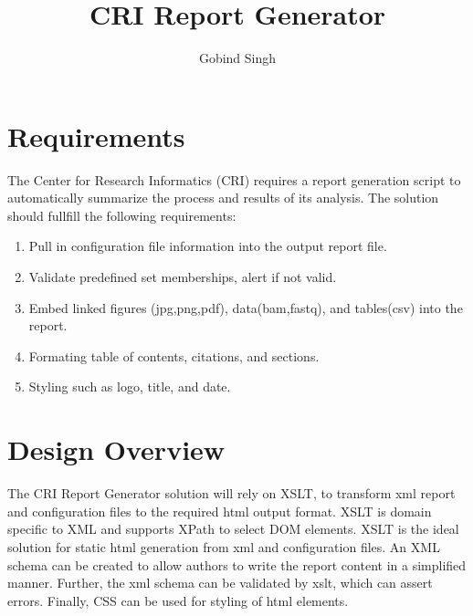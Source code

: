 \documentclass{article}
\title{CRI Report Generator}
\author{Gobind Singh}
\date{ }
\begin{document}
 
\maketitle
 
\tableofcontents
 
\section{Requirements}
 
The Center for Research Informatics (CRI) requires a report generation script to automatically summarize the process and results of its analysis.  The solution should fullfill the following requirements:
\begin{enumerate}
    \item Pull in configuration file information into the output report file.
    \item Validate predefined set memberships, alert if not valid. 
    \item Embed linked figures (jpg,png,pdf), data(bam,fastq), and tables(csv) into the report.
    \item Formating table of contents, citations, and sections.
    \item Styling such as logo, title, and date. 
\end{enumerate}

 
\section{Design Overview}
The CRI Report Generator solution will rely on XSLT, to transform xml report and configuration files to the required html output format.  XSLT is domain specific to XML and supports XPath to select DOM elements.  XSLT is the ideal solution for static html generation from xml and configuration files.  An XML schema can be created to allow authors to write the report content in a simplified manner.  Further, the xml schema can be validated by xslt, which can assert errors.  Finally, CSS can be used for styling of html elements.  


\end{document}
